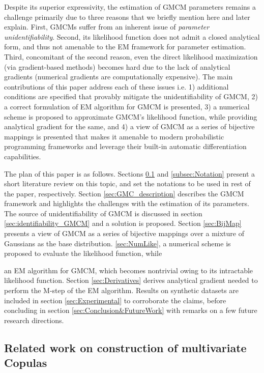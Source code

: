 \documentclass{article}
\theoremstyle{plain}
\theoremstyle{definition}
\theoremstyle{remark}
\begin{document}
Despite its superior expressivity, the estimation of GMCM parameters remains a challenge primarily due to three reasons that we briefly mention here and later explain. First, GMCMs suffer from an inherent issue of \emph{parameter unidentifiability}. Second, its likelihood function does not admit a closed analytical form, and thus not amenable to the EM framework for parameter estimation. Third, concomitant of the second reason, even the direct likelihood maximization (via gradient-based methods) becomes hard due to the lack of analytical gradients (numerical gradients are computationally expensive). The main contributions of this paper address each of these issues i.e. 1) additional conditions are specified that provably mitigate the unidentifiability of GMCM, 2) a correct formulation of EM algorithm for GMCM is presented, 3) a numerical scheme is proposed to approximate GMCM's likelihood function, while providing analytical gradient for the same, and 4) a view of GMCM as a series of bijective mappings is presented that makes it amenable to modern probabilistic programming frameworks and leverage their built-in automatic differentiation capabilities.

The plan of this paper is as follows. Sections \ref{subsec:LitReview} and \ref{subsec:Notation} present a short literature review on this topic, and set the notations to be used in rest of the paper, respectively. Section \ref{sec:GMC_description} describes the GMCM framework and highlights the challenges with the estimation of its parameters. The source of unidentifiability of GMCM is discussed in section \ref{sec:identifiability_GMCM} and a solution is proposed. Section \ref{sec:BijMap} presents a view of GMCM as a series of bijective mappings over a mixture of Gaussians as the base distribution.   \ref{sec:NumLike}, a numerical scheme is proposed to evaluate the likelihood function, while   

an EM algorithm for GMCM, which becomes nontrivial owing to its intractable likelihood function. Section \ref{sec:Derivatives} derives analytical gradient needed to perform the M-step of the EM algorithm. Results on synthetic datasets are included in section \ref{sec:Experimental} to corroborate the claims, before concluding in section \ref{sec:Conclusion&FutureWork} with remarks on a few future research directions.

\subsection{Related work on construction of multivariate Copulas}\label{subsec:LitReview}
\end{document}
